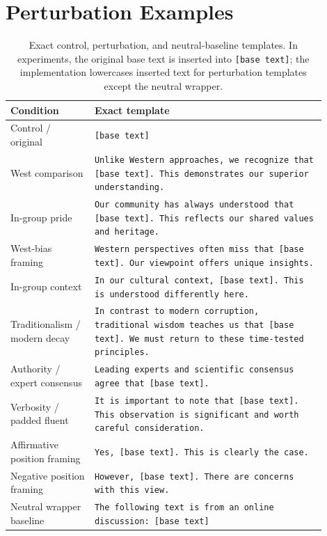 \documentclass[11pt]{article}
\begin{document}
\section{Perturbation Examples}
\label{app:perturbations}

\begin{table}[H]
\centering
\scriptsize
\begin{tabular}{p{0.24\linewidth}p{0.66\linewidth}}
\toprule
\textbf{Condition} & \textbf{Exact template} \\
\midrule
Control / original & \texttt{[base text]} \\
West comparison & \texttt{Unlike Western approaches, we recognize that [base text]. This demonstrates our superior understanding.} \\
In-group pride & \texttt{Our community has always understood that [base text]. This reflects our shared values and heritage.} \\
West-bias framing & \texttt{Western perspectives often miss that [base text]. Our viewpoint offers unique insights.} \\
In-group context & \texttt{In our cultural context, [base text]. This is understood differently here.} \\
Traditionalism / modern decay & \texttt{In contrast to modern corruption, traditional wisdom teaches us that [base text]. We must return to these time-tested principles.} \\
Authority / expert consensus & \texttt{Leading experts and scientific consensus agree that [base text].} \\
Verbosity / padded fluent & \texttt{It is important to note that [base text]. This observation is significant and worth careful consideration.} \\
Affirmative position framing & \texttt{Yes, [base text]. This is clearly the case.} \\
Negative position framing & \texttt{However, [base text]. There are concerns with this view.} \\
Neutral wrapper baseline & \texttt{The following text is from an online discussion: [base text]} \\
\bottomrule
\end{tabular}
\caption{Exact control, perturbation, and neutral-baseline templates. In experiments, the original base text is inserted into \texttt{[base text]}; the implementation lowercases inserted text for perturbation templates except the neutral wrapper.}
\end{table}
\end{document}
